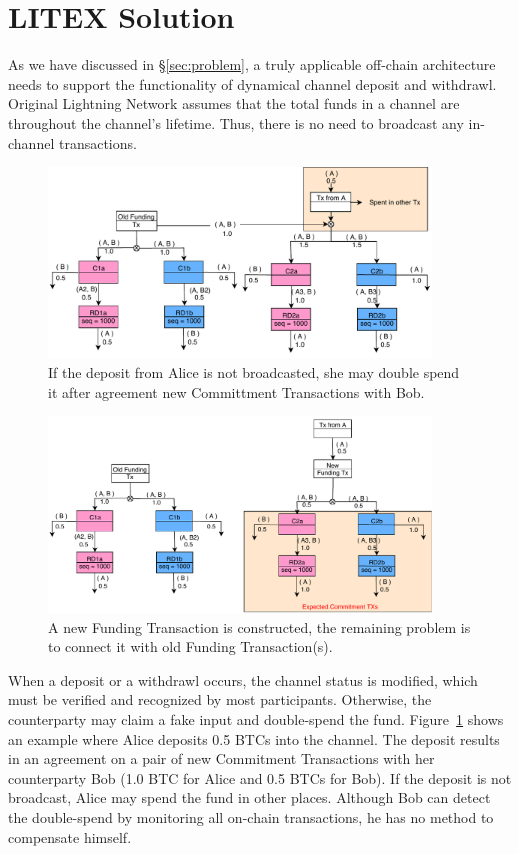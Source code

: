 \section{LITEX Solution}
\label{sec:solution}


As we have discussed in \S\ref{sec:problem}, a truly applicable off-chain
architecture needs to support the functionality of dynamical channel deposit and
withdrawl. Original Lightning Network assumes that the total funds in a channel
are throughout the channel's lifetime. Thus, there is no need to broadcast any
in-channel transactions.

\begin{figure}[t]
\centering
\includegraphics[width=4in]{figs/fake.pdf}
\vspace{-6pt}
\caption{If the deposit from Alice is not broadcasted, she may double spend it after agreement new Committment Transactions with Bob.}
\label{fig:fake}
\end{figure}

\begin{figure}[t]
\centering
\includegraphics[width=4in]{figs/fund.pdf}
\vspace{-6pt}
\caption{A new Funding Transaction is constructed, the remaining problem is to connect it with old Funding Transaction(s).}
\label{fig:fund}
\end{figure}


When a deposit or a withdrawl occurs, the channel status is modified, which must be verified and recognized by most participants. Otherwise, the counterparty may claim a fake input and double-spend the fund. Figure~\ref{fig:fake} shows an example where Alice deposits 0.5 BTCs into the channel. The deposit results in an agreement on a pair of new Commitment Transactions with her counterparty Bob (1.0 BTC for Alice and 0.5 BTCs for Bob). If the deposit is not broadcast, Alice may spend the fund in other places. Although Bob can detect the double-spend by monitoring all on-chain transactions, he has no method to compensate himself.


